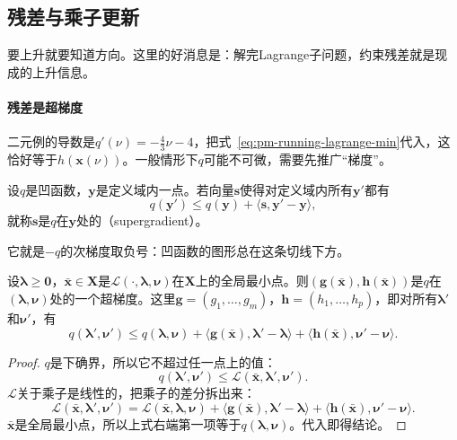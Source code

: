 \subsection{残差与乘子更新}
\label{sec:pm-dual-update}

要上升就要知道方向。这里的好消息是：解完Lagrange子问题，约束残差就是现成的上升信息。

\paragraph{残差是超梯度}
二元例的导数是$q'(\nu)=-\tfrac43\nu-4$，把式~\eqref{eq:pm-running-lagrange-min}代入，这恰好等于$h(\bm{x}(\nu))$。一般情形下$q$可能不可微，需要先推广“梯度”。

\begin{definition}[超梯度]
\label{def:pm-supergradient}
设$q$是凹函数，$\bm{y}$是定义域内一点。若向量$\bm{s}$使得对定义域内所有$\bm{y}'$都有
\begin{equation}
 q(\bm{y}')\leq q(\bm{y})+\langle\bm{s},\bm{y}'-\bm{y}\rangle,
 \label{eq:pm-supergradient}
\end{equation}
就称$\bm{s}$是$q$在$\bm{y}$处的（supergradient）。
\end{definition}

它就是$-q$的次梯度取负号：凹函数的图形总在这条切线下方。

\begin{theorem}[残差给出超梯度]
\label{thm:pm-residual-supergradient}
设$\bm{\lambda}\geq\bm{0}$，$\bar{\bm{x}}\in\bm{X}$是$\mathcal{L}(\cdot,\bm{\lambda},\bm{\nu})$在$\bm{X}$上的全局最小点。则$(\bm{g}(\bar{\bm{x}}),\bm{h}(\bar{\bm{x}}))$是$q$在$(\bm{\lambda},\bm{\nu})$处的一个超梯度。这里$\bm{g}=(g_1,\ldots,g_m)$，$\bm{h}=(h_1,\ldots,h_p)$，即对所有$\bm{\lambda}'$和$\bm{\nu}'$，有
\begin{equation}
 q(\bm{\lambda}',\bm{\nu}')\leq q(\bm{\lambda},\bm{\nu})+\langle\bm{g}(\bar{\bm{x}}),\bm{\lambda}'-\bm{\lambda}\rangle+\langle\bm{h}(\bar{\bm{x}}),\bm{\nu}'-\bm{\nu}\rangle .
 \label{eq:pm-residual-supergradient}
\end{equation}
\end{theorem}

\begin{proof}
$q$是下确界，所以它不超过任一点上的值：
\[
 q(\bm{\lambda}',\bm{\nu}')\leq\mathcal{L}(\bar{\bm{x}},\bm{\lambda}',\bm{\nu}').
\]
$\mathcal{L}$关于乘子是线性的，把乘子的差分拆出来：
\[
 \mathcal{L}(\bar{\bm{x}},\bm{\lambda}',\bm{\nu}')
 =\mathcal{L}(\bar{\bm{x}},\bm{\lambda},\bm{\nu})+\langle\bm{g}(\bar{\bm{x}}),\bm{\lambda}'-\bm{\lambda}\rangle+\langle\bm{h}(\bar{\bm{x}}),\bm{\nu}'-\bm{\nu}\rangle .
\]
$\bar{\bm{x}}$是全局最小点，所以上式右端第一项等于$q(\bm{\lambda},\bm{\nu})$。代入即得结论。
\end{proof}

